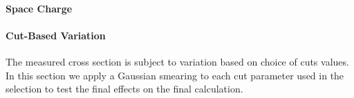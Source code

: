 \documentclass[12pt]{article}
\begin{document}
\paragraph{Space Charge}
\paragraph{Cut-Based Variation}
The measured cross section is subject to variation based on choice of cuts values. In this section we apply a Gaussian smearing to each cut parameter used in the selection to test the final effects on the final calculation.




%
\end{document}

